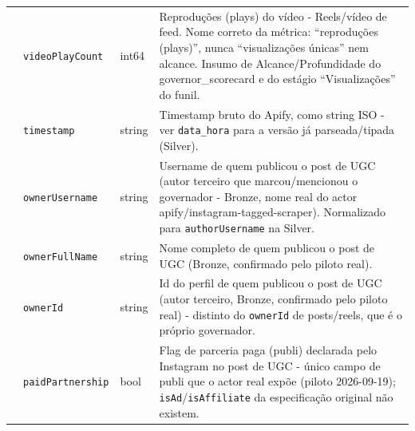 \begin{footnotesize}
\begin{longtable}{p{3.2cm}p{3.0cm}p{2.0cm}p{6.0cm}}
\texttt{} & \texttt{videoPlayCount} & int64 & Reproduções (plays) do vídeo - Reels/\allowbreak{}vídeo de feed. Nome correto da métrica: ``reproduções (plays)'', nunca ``visualizações únicas'' nem alcance. Insumo de Alcance/\allowbreak{}Profundidade do governor\_\allowbreak{}scorecard e do estágio ``Visualizações'' do funil. \\
\texttt{} & \texttt{timestamp} & string & Timestamp bruto do Apify, como string ISO - ver \texttt{data\_\allowbreak{}hora} para a versão já parseada/\allowbreak{}tipada (Silver). \\
\texttt{} & \texttt{ownerUsername} & string & Username de quem publicou o post de UGC (autor terceiro que marcou/\allowbreak{}mencionou o governador - Bronze, nome real do actor apify/\allowbreak{}instagram-tagged-scraper). Normalizado para \texttt{authorUsername} na Silver. \\
\texttt{} & \texttt{ownerFullName} & string & Nome completo de quem publicou o post de UGC (Bronze, confirmado pelo piloto real). \\
\texttt{} & \texttt{ownerId} & string & Id do perfil de quem publicou o post de UGC (autor terceiro, Bronze, confirmado pelo piloto real) - distinto do \texttt{ownerId} de posts/\allowbreak{}reels, que é o próprio governador. \\
\texttt{} & \texttt{paidPartnership} & bool & Flag de parceria paga (publi) declarada pelo Instagram no post de UGC - único campo de publi que o actor real expõe (piloto 2026-09-19); \texttt{isAd}/\allowbreak{}\texttt{isAffiliate} da especificação original não existem. \\
\end{longtable}
\end{footnotesize}

